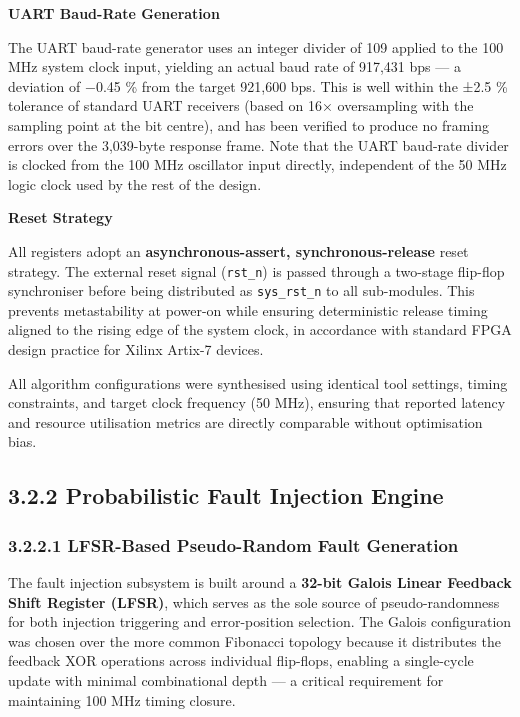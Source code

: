 \documentclass[
  12pt,
  a4paper]{report}
\begin{document}
\textbf{UART Baud-Rate Generation}

The UART baud-rate generator uses an integer divider of 109 applied to
the 100 MHz system clock input, yielding an actual baud rate of 917,431
bps --- a deviation of −0.45 \% from the target 921,600 bps. This is
well within the ±2.5 \% tolerance of standard UART receivers (based on
16× oversampling with the sampling point at the bit centre), and has
been verified to produce no framing errors over the 3,039-byte response
frame. Note that the UART baud-rate divider is clocked from the 100 MHz
oscillator input directly, independent of the 50 MHz logic clock used by
the rest of the design.

\textbf{Reset Strategy}

All registers adopt an \textbf{asynchronous-assert, synchronous-release}
reset strategy. The external reset signal (\texttt{rst\_n}) is passed
through a two-stage flip-flop synchroniser before being distributed as
\texttt{sys\_rst\_n} to all sub-modules. This prevents metastability at
power-on while ensuring deterministic release timing aligned to the
rising edge of the system clock, in accordance with standard FPGA design
practice for Xilinx Artix-7 devices.

All algorithm configurations were synthesised using identical tool
settings, timing constraints, and target clock frequency (50 MHz),
ensuring that reported latency and resource utilisation metrics are
directly comparable without optimisation bias.

\subsection{3.2.2 Probabilistic Fault Injection
Engine}\label{probabilistic-fault-injection-engine}

\subsubsection{3.2.2.1 LFSR-Based Pseudo-Random Fault
Generation}\label{lfsr-based-pseudo-random-fault-generation}

The fault injection subsystem is built around a \textbf{32-bit Galois
Linear Feedback Shift Register (LFSR)}, which serves as the sole source
of pseudo-randomness for both injection triggering and error-position
selection. The Galois configuration was chosen over the more common
Fibonacci topology because it distributes the feedback XOR operations
across individual flip-flops, enabling a single-cycle update with
minimal combinational depth --- a critical requirement for maintaining
100 MHz timing closure.
\end{document}
